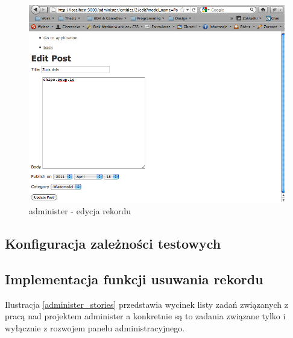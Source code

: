 	\begin{figure}[!h]
		\begin{center}
			\includegraphics[width=\linewidth]{images/administer_edit.png}
			\caption{administer - edycja rekordu}
			\label{administer_edit}
		\end{center}
	\end{figure}
  
  \subsection{Konfiguracja zależności testowych}
    
  \subsection{Implementacja funkcji usuwania rekordu}
    
    Ilustracja \ref{administer_stories}  przedstawia wycinek listy zadań związanych z pracą nad projektem administer a konkretnie są to zadania związane tylko i wyłącznie z rozwojem  panelu administracyjnego.
    
    \clearpage
    
